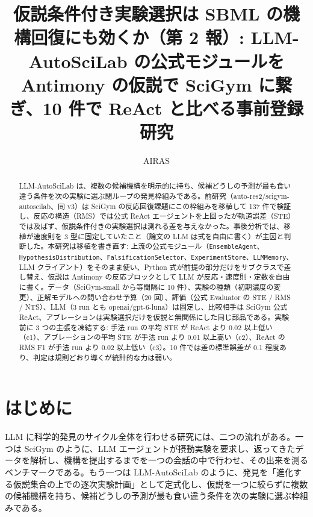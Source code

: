 \documentclass{article}
\title{仮説条件付き実験選択は SBML の機構回復にも効くか（第 2 報）: LLM-AutoSciLab の公式モジュールを Antimony の仮説で SciGym に繋ぎ、10 件で ReAct と比べる事前登録研究}
\author{AIRAS}
\begin{document}
\maketitle

\begin{abstract}
LLM-AutoSciLab \citep{kabra-2026-llm} は、複数の候補機構を明示的に持ち、候補どうしの予測が最も食い違う条件を次の実験に選ぶ閉ループの発見枠組みである。前研究（auto-res2/scigym-autoscilab、同 v3）は SciGym \citep{duan-2025-measuring} の反応回復課題にこの枠組みを移植して 137 件で検証し、反応の構造（RMS）では公式 ReAct エージェントを上回ったが軌道誤差（STE）では及ばず、仮説条件付きの実験選択は測れる差を与えなかった。事後分析では、移植が速度則を 3 型に固定していたこと（論文の LLM は式を自由に書く）が主因と判断した。本研究は移植を書き直す: 上流の公式モジュール（\texttt{EnsembleAgent}、\texttt{HypothesisDistribution}、\texttt{FalsificationSelector}、\texttt{ExperimentStore}、\texttt{LLMMemory}、LLM クライアント）をそのまま使い、Python 式が前提の部分だけをサブクラスで差し替え、仮説は Antimony の反応ブロックとして LLM が反応・速度則・定数を自由に書く。データ（SciGym-small から等間隔に 10 件）、実験の種類（初期濃度の変更）、正解モデルへの問い合わせ予算（20 回）、評価（公式 Evaluator の STE / RMS / NTS）、LLM（3 run とも openai/gpt-6-luna）は固定し、比較相手は SciGym 公式 ReAct、アブレーションは実験選択だけを仮説と無関係にした同じ部品である。実験前に 3 つの主張を凍結する: 手法 run の平均 STE が ReAct より 0.02 以上低い（c1）、アブレーションの平均 STE が手法 run より 0.01 以上高い（c2）、ReAct の RMS F1 が手法 run より 0.02 以上低い（c3）。10 件では差の標準誤差が 0.1 程度あり、判定は規則どおり導くが統計的な力は弱い。
\end{abstract}

\section{はじめに}
\label{sec:intro}
LLM に科学的発見のサイクル全体を行わせる研究には、二つの流れがある。一つは SciGym \citep{duan-2025-measuring} のように、LLM エージェントが摂動実験を要求し、返ってきたデータを解析し、機構を提出するまでを一つの会話の中で行わせ、その出来を測るベンチマークである。もう一つは LLM-AutoSciLab \citep{kabra-2026-llm} のように、発見を「進化する仮説集合の上での逐次実験計画」として定式化し、仮説を一つに絞らずに複数の候補機構を持ち、候補どうしの予測が最も食い違う条件を次の実験に選ぶ枠組みである。
\end{document}
